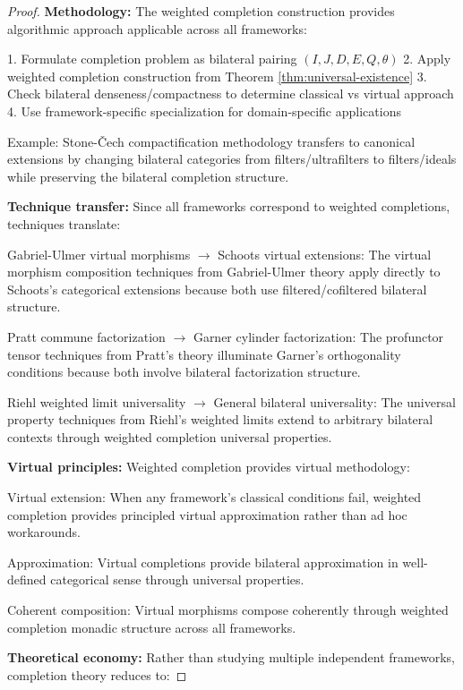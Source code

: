 \documentclass[11pt]{article}
\theoremstyle{plain}
\theoremstyle{definition}
\theoremstyle{remark}
\begin{document}
\begin{proof}
\textbf{Methodology:} The weighted completion construction provides algorithmic approach applicable across all frameworks:

1. Formulate completion problem as bilateral pairing $(I, J, D, E, Q, \theta)$
2. Apply weighted completion construction from Theorem \ref{thm:universal-existence}
3. Check bilateral denseness/compactness to determine classical vs virtual approach
4. Use framework-specific specialization for domain-specific applications

Example: Stone-\v{C}ech compactification methodology transfers to canonical extensions by changing bilateral categories from filters/ultrafilters to filters/ideals while preserving the bilateral completion structure.

\textbf{Technique transfer:} Since all frameworks correspond to weighted completions, techniques translate:

Gabriel-Ulmer virtual morphisms $\to$ Schoots virtual extensions: The virtual morphism composition techniques from Gabriel-Ulmer theory apply directly to Schoots's categorical extensions because both use filtered/cofiltered bilateral structure.

Pratt commune factorization $\to$ Garner cylinder factorization: The profunctor tensor techniques from Pratt's theory illuminate Garner's orthogonality conditions because both involve bilateral factorization structure.

Riehl weighted limit universality $\to$ General bilateral universality: The universal property techniques from Riehl's weighted limits extend to arbitrary bilateral contexts through weighted completion universal properties.

\textbf{Virtual principles:} Weighted completion provides virtual methodology:

Virtual extension: When any framework's classical conditions fail, weighted completion provides principled virtual approximation rather than ad hoc workarounds.

Approximation: Virtual completions provide bilateral approximation in well-defined categorical sense through universal properties.

Coherent composition: Virtual morphisms compose coherently through weighted completion monadic structure across all frameworks.

\textbf{Theoretical economy:} Rather than studying multiple independent frameworks, completion theory reduces to:


\end{proof}
\end{document}
